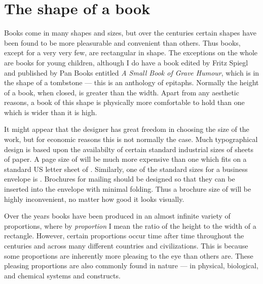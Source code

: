 \documentclass[10pt,a4paper,extrafontsizes]{memoir}
\begin{document}
\section{The shape of a book}

\begin{paracol}{2}
\switchEng
    Books come in many shapes and sizes, but over the centuries certain
shapes have been found to be more pleasurable and convenient than others.
Thus books, except for a very very few, are rectangular in shape. The 
exceptions on the whole are books for young children, although I do
have a book edited by Fritz Spiegl and published by Pan Books entitled
\textit{A Small Book of Grave Humour}, which is in the shape of a tombstone
--- this is an anthology of epitaphs. Normally the height of a book, when 
closed, is greater than the width. Apart from any aesthetic reasons, 
a book of this shape is physically more comfortable to hold than one which 
is wider than it is high.

    It might appear that the designer has great freedom in choosing the
size of the work, but for economic reasons this is not normally the case.
Much typographical design is based upon the availabilty of certain 
standard industrial sizes of sheets of paper. 
A page size of  will be much more expensive than one 
which fits on a standard
US letter sheet 
of . 
Similarly, one of the standard sizes
for a business envelope is . 
Brochures for mailing
should be designed so that they can be inserted into the envelope with 
minimal folding. Thus a brochure size of  will be 
highly inconvenient, no matter how good it looks visually.

    Over the years books have been produced in an almost infinite variety
of proportions,
where by \emph{proportion}
I mean the ratio of the height to the width of a
rectangle. However, certain proportions occur time after time throughout
the centuries and across many different countries and 
civilizations. This is because some proportions are inherently
more pleasing to the eye than others are. These pleasing proportions are
also commonly found in nature --- in  physical, biological, and chemical
systems and constructs. 
\end{paracol}

\end{document}
